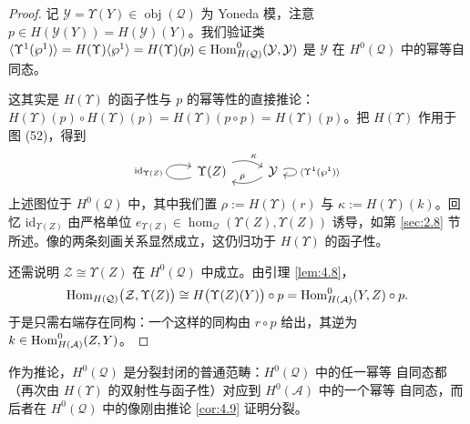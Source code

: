 \begin{proof}
记 $\mathcal Y=\Upsilon(Y)\in\operatorname{obj}(\mathcal Q)$ 为 Yoneda 模，注意
$p\in H(\mathcal Y(Y))=H(\mathcal Y)(Y)$。我们验证类
$\langle\Upsilon^1(\wp^1)\rangle=H(\Upsilon)\langle\wp^1\rangle=H(\Upsilon)(p)
\in\operatorname{Hom}^0_{H(\mathcal Q)}(\mathcal Y,\mathcal Y)$ 是 $\mathcal Y$ 在 $H^0(\mathcal Q)$
中的幂等自同态。

这其实是 $H(\Upsilon)$ 的函子性与 $p$ 的幂等性的直接推论：
$H(\Upsilon)(p)\circ H(\Upsilon)(p)=H(\Upsilon)(p\circ p)=H(\Upsilon)(p)$。把
$H(\Upsilon)$ 作用于图 (52)，得到
\begin{equation}\label{eq:4.53}
  \begin{tikzcd}
    \Upsilon(Z) \arrow[loop left, "{\mathrm{id}_{\Upsilon(Z)}}"]
      \arrow[r, bend left=25, "\kappa"]
      & \mathcal Y \arrow[l, bend left=25, "\rho"']
      \arrow[loop right, "{\langle\Upsilon^1(\wp^1)\rangle}"]
  \end{tikzcd}
\end{equation}
上述图位于 $H^0(\mathcal Q)$ 中，其中我们置 $\rho:=H(\Upsilon)(r)$ 与
$\kappa:=H(\Upsilon)(k)$。回忆 $\mathrm{id}_{\Upsilon(Z)}$ 由严格单位
$e_{\Upsilon(Z)}\in\hom_{\mathcal Q}(\Upsilon(Z),\Upsilon(Z))$ 诱导，如第
\ref{sec:2.8} 节所述。像的两条刻画关系显然成立，这仍归功于 $H(\Upsilon)$ 的函子性。

还需说明 $\mathcal Z\cong\Upsilon(Z)$ 在 $H^0(\mathcal Q)$ 中成立。由引理 \ref{lem:4.8}，
\[
  \operatorname{Hom}_{H(\mathcal Q)}\bigl(\mathcal Z,\Upsilon(Z)\bigr)
  \cong H\bigl(\Upsilon(Z)(Y)\bigr)\circ p
  =\operatorname{Hom}^0_{H(\mathcal A)}(Y,Z)\circ p.
\]
于是只需右端存在同构：一个这样的同构由 $r\circ p$ 给出，其逆为
$k\in\operatorname{Hom}^0_{H(\mathcal A)}(Z,Y)$。
\end{proof}

作为推论，$H^0(\mathcal Q)$ 是分裂封闭的普通范畴：$H^0(\mathcal Q)$ 中的任一幂等
自同态都（再次由 $H(\Upsilon)$ 的双射性与函子性）对应到 $H^0(\mathcal A)$ 中的一个幂等
自同态，而后者在 $H^0(\mathcal Q)$ 中的像刚由推论 \ref{cor:4.9} 证明分裂。


